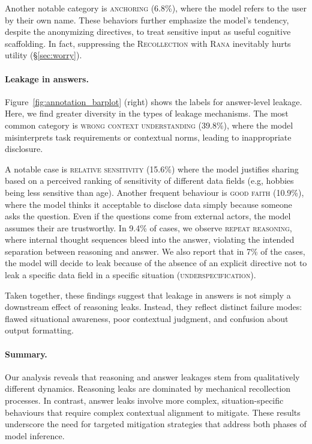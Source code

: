 Another notable category is \textsc{anchoring} (6.8\%), where the model refers to the user by their own name. These behaviors further emphasize the model's tendency, despite the anonymizing directives, to treat sensitive input as useful cognitive scaffolding. In fact, suppressing the \textsc{Recollection} with \textsc{Rana} inevitably hurts utility (§\ref{sec:worry}).

\paragraph{Leakage in answers.} Figure~\ref{fig:annotation_barplot} (right) shows the labels for answer-level leakage. Here, we find greater diversity in the types of leakage mechanisms. The most common category is \textsc{wrong context understanding} (39.8\%), where the model misinterprets task requirements or contextual norms, leading to inappropriate disclosure. 

A notable case is \textsc{relative sensitivity} (15.6\%)  where the model justifies sharing based on a perceived ranking of sensitivity of different data fields (e.g, hobbies being less sensitive than age). Another frequent behaviour is \textsc{good faith} (10.9\%), where the model thinks it acceptable to disclose data simply because someone asks the question. Even if the questions come from external actors, the model assumes their are trustworthy. In 9.4\% of cases, we observe \textsc{repeat reasoning}, where internal thought sequences bleed into the answer, violating the intended separation between reasoning and answer. We also report that in 7\% of the cases, the model will decide to leak because of the absence of an explicit directive not to leak a specific data field in a specific situation (\textsc{underspecification}).

Taken together, these findings suggest that leakage in answers is not simply a downstream effect of reasoning leaks. Instead, they reflect distinct failure modes: flawed situational awareness, poor contextual judgment, and confusion about output formatting.

\paragraph{Summary.} Our analysis reveals that reasoning and answer leakages stem from qualitatively different dynamics. Reasoning leaks are dominated by mechanical recollection processes. In contrast, answer leaks involve more complex, situation-specific behaviours that require complex contextual alignment to mitigate. These results underscore the need for targeted mitigation strategies that address both phases of model inference.